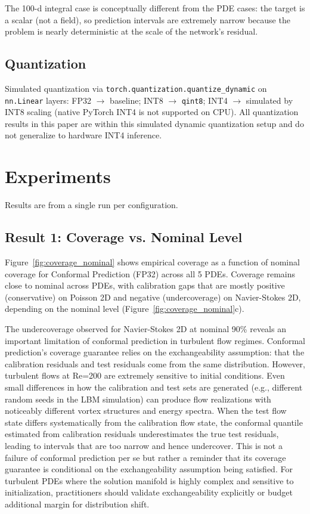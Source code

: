 \documentclass[12pt,a4paper]{article}
\theoremstyle{plain}
\begin{document}
The 100-d integral case is conceptually different from the PDE cases:
the target is a scalar (not a field), so prediction intervals are
extremely narrow because the problem is nearly deterministic
at the scale of the network's residual.

\subsection{Quantization}

Simulated quantization via \texttt{torch.quantization.quantize\_dynamic}
on \texttt{nn.Linear} layers:
FP32 $\rightarrow$ baseline; INT8 $\rightarrow$ \texttt{qint8};
INT4 $\rightarrow$ simulated by INT8 scaling
(native PyTorch INT4 is not supported on CPU).
All quantization results in this paper are within this simulated
dynamic quantization setup and do not generalize to hardware INT4 inference.

\section{Experiments}
\label{sec:experiments}
Results are from a single run per configuration.

\subsection{Result 1: Coverage vs. Nominal Level}
\label{sec:coverage_nominal}

Figure~\ref{fig:coverage_nominal} shows empirical coverage as a function of
nominal coverage for Conformal Prediction (FP32) across all 5 PDEs.
Coverage remains close to nominal across PDEs, with calibration gaps
that are mostly positive (conservative) on Poisson 2D and negative
(undercoverage) on Navier-Stokes 2D, depending on the nominal level
(Figure~\ref{fig:coverage_nominal}c).

The undercoverage observed for Navier-Stokes 2D at nominal 90\% reveals an
important limitation of conformal prediction in turbulent flow regimes.
Conformal prediction's coverage guarantee relies on the exchangeability
assumption: that the calibration residuals and test residuals come from the
same distribution. However, turbulent flows at Re=200 are extremely sensitive
to initial conditions. Even small differences in how the calibration and test
sets are generated (e.g., different random seeds in the LBM simulation) can
produce flow realizations with noticeably different vortex structures and
energy spectra. When the test flow state differs systematically from the
calibration flow state, the conformal quantile estimated from calibration
residuals underestimates the true test residuals, leading to intervals that
are too narrow and hence undercover. This is not a failure of conformal
prediction per se but rather a reminder that its coverage guarantee is
conditional on the exchangeability assumption being satisfied. For turbulent
PDEs where the solution manifold is highly complex and sensitive to
initialization, practitioners should validate exchangeability explicitly or
budget additional margin for distribution shift.
\end{document}
